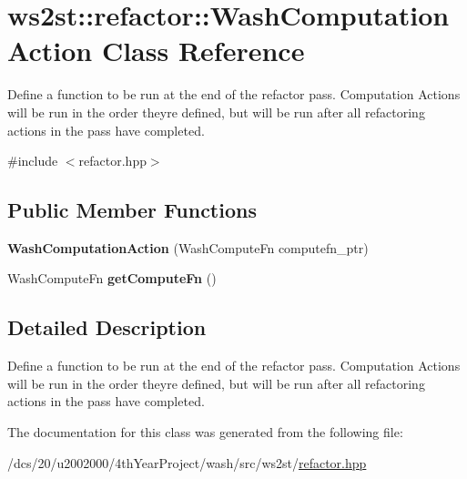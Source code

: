 \hypertarget{classws2st_1_1refactor_1_1WashComputationAction}{}\section{ws2st\+:\+:refactor\+:\+:Wash\+Computation\+Action Class Reference}
\label{classws2st_1_1refactor_1_1WashComputationAction}


Define a function to be run at the end of the refactor pass. Computation Actions will be run in the order they\textquotesingle{}re defined, but will be run after all refactoring actions in the pass have completed.  




{\ttfamily \#include $<$refactor.\+hpp$>$}

\subsection*{Public Member Functions}
\begin{DoxyCompactItemize}
\item 
\mbox{\label{classws2st_1_1refactor_1_1WashComputationAction_a5371af5f19e07759f4863e7b6011e787}} 
{\bfseries Wash\+Computation\+Action} (Wash\+Compute\+Fn computefn\+\_\+ptr)
\item 
\mbox{\label{classws2st_1_1refactor_1_1WashComputationAction_a195edd152f7fd88ca90d6dc7fb4897dc}} 
Wash\+Compute\+Fn {\bfseries get\+Compute\+Fn} ()
\end{DoxyCompactItemize}


\subsection{Detailed Description}
Define a function to be run at the end of the refactor pass. Computation Actions will be run in the order they\textquotesingle{}re defined, but will be run after all refactoring actions in the pass have completed. 

The documentation for this class was generated from the following file\+:\begin{DoxyCompactItemize}
\item 
/dcs/20/u2002000/4th\+Year\+Project/wash/src/ws2st/\mbox{\hyperlink{refactor_8hpp}{refactor.\+hpp}}\end{DoxyCompactItemize}
